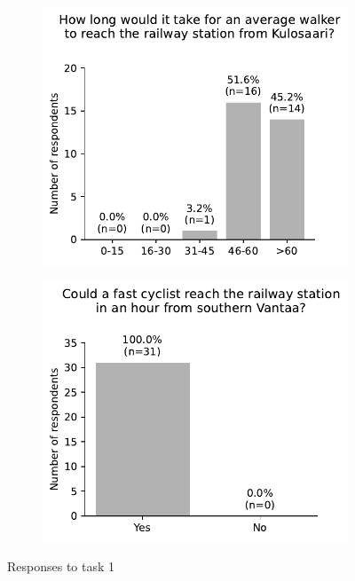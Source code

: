 \begin{appendices}
\begin{figure}[H]
	\begin{subfigure}[b]{0.5\textwidth}
		\includegraphics[width=\textwidth]{visual/figures/survey/0.pdf}
	\end{subfigure}%
	\hfill
	\begin{subfigure}[b]{0.5\textwidth}
		\includegraphics[width=\textwidth]{visual/figures/survey/1.pdf}
	\end{subfigure}%
	\newline
	Responses to task 1
\end{figure}


\end{appendices}
